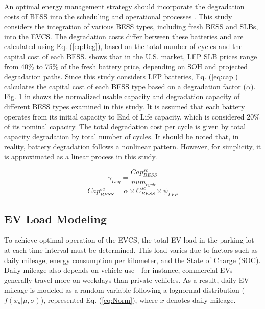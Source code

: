 \documentclass[10pt, journal]{IEEEtran}
\begin{document}
An optimal energy management strategy should incorporate the degradation costs of BESS into the scheduling and operational processes \cite{amini2023predictive}. This study considers the integration of various BESS types, including fresh BESS and SLBs, into the EVCS. The degradation costs differ between these batteries and are calculated using Eq. (\ref{eq:Deg}), based on the total number of cycles and the capital cost of each BESS. \cite{bach2024fair} shows that in the U.S. market, LFP SLB prices range from 40\% to 75\% of the fresh battery price, depending on SOH and projected degradation paths. Since this study considers LFP batteries, Eq. (\ref{eq:cap}) calculates the capital cost of each BESS type based on a degradation factor (\(\alpha\)). Fig. 1 in \cite{Github_repository} shows the normalized usable capacity and degradation capacity of different BESS types examined in this study. It is assumed that each battery operates from its initial capacity to End of Life capacity, which is considered 20\% of its nominal capacity. The total degradation cost per cycle is given by total capacity degradation by total number of cycles. It should be noted that, in reality, battery degradation follows a nonlinear pattern. However, for simplicity, it is approximated as a linear process in this study.

\vspace{-3mm}
{\small
\begin{equation}
    \label{eq:Deg}
    \gamma_{Deg} = \frac{Cap_{BESS}^{sc}}{num_{cycle}}
\end{equation}
\begin{equation}
    \label{eq:cap}
    Cap_{BESS}^{sc} = \alpha \times C_{BESS}^{sc} \times \psi_{LFP}
\end{equation}}

\vspace{-5mm}
\subsection{EV Load Modeling}
To achieve optimal operation of the EVCS, the total EV load in the parking lot at each time interval must be determined. This load varies due to factors such as daily mileage, energy consumption per kilometer, and the State of Charge (SOC). Daily mileage also depends on vehicle use—for instance, commercial EVs generally travel more on weekdays than private vehicles. As a result, daily EV mileage is modeled as a random variable following a lognormal distribution (\(f(x_{d} | \mu, \sigma)\)), represented Eq. (\ref{eq:Norm}), where \(x\) denotes daily mileage. 
\end{document}
